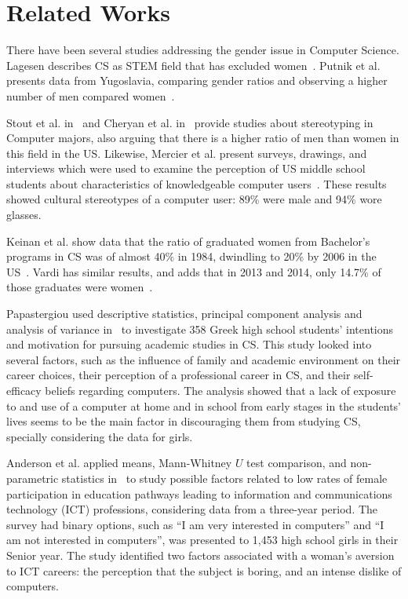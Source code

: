 \section{Related Works}\label{sec:related}%
There have been several studies addressing the gender issue in Computer Science. Lagesen describes CS as STEM field that has excluded women~\cite{vivian_2007}. Putnik et al. presents data from Yugoslavia, comparing gender ratios and observing a higher number of men compared women~\cite{zoran_2017}.

Stout et al. in~\cite{jane_2016} and Cheryan et al. in~\cite{sappa_2013} provide studies about stereotyping in Computer majors, also arguing that there is a higher ratio of men than women in this field in the US. Likewise, Mercier et al. present surveys, drawings, and interviews which were used to examine the perception of US middle school students about characteristics of knowledgeable computer users~\cite{Mercier_2006}. These results showed cultural stereotypes of a computer user: 89\% were male and 94\% wore glasses.

Keinan et al. show data that the ratio of graduated women from Bachelor's programs in CS was of almost 40\% in 1984, dwindling to 20\% by 2006 in the US~\cite{keinan_2017}. Vardi has similar results, and adds that in 2013 and 2014, only 14.7\% of those graduates were women~\cite{moshe_2015}.

Papastergiou used descriptive statistics, principal component analysis and analysis of variance in~\cite{papastergiou_are_2008} to investigate 358 Greek high school students' intentions and motivation for pursuing academic studies in CS. This study looked into several factors, such as the influence of family and academic environment on their career choices, their perception of a professional career in CS, and their self-efficacy beliefs regarding computers. The analysis showed that a lack of exposure to and use of a computer at home and in school from early stages in the students' lives seems to be the main factor in discouraging them from studying CS, specially considering the data for girls.

Anderson et al. applied means, \mbox{Mann-Whitney} $U$ test comparison, and non-parametric statistics in~\cite{anderson_because_2008} to study possible factors related to low rates of female participation in education pathways leading to information and communications technology (ICT) professions, considering data from a three-year period. The survey had binary options, such as ``I am very interested in computers'' and ``I am not interested in computers'', was presented to 1,453 high school girls in their Senior year. The study identified two factors associated with a woman's aversion to ICT careers: the perception that the subject is boring, and an intense dislike of computers.


